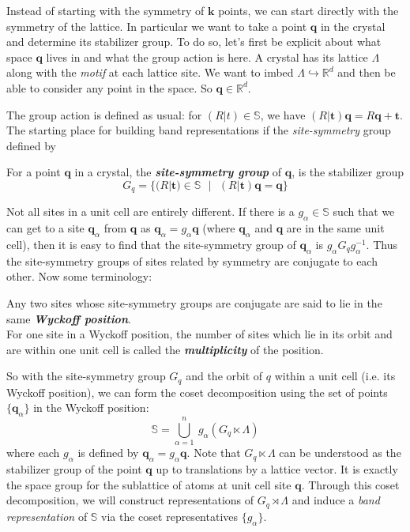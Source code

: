 \documentclass[9 pt]{report}
\def\*#1{\boldsymbol{#1}}
\begin{document}
Instead of starting with the symmetry of $\*k$ points, we can start directly with the symmetry of the lattice. In particular we want to take a point $\*q$ in the crystal and determine its stabilizer group. To do so, let's first be explicit about what space $\*q$ lives in and what the group action is here. A crystal has its lattice $\Lambda$ along with the \emph{motif} at each lattice site. We want to imbed $\Lambda \hookrightarrow \mathbb{R}^d$ and then be able to consider any point in the space. So $\*q\in \mathbb{R}^d$.

The group action is defined as usual: for $(R|t)\in\mathbb{S}$, we have $(R|\*t)\*q = R\*q + \*t$. The starting place for building band representations if the \emph{site-symmetry} group defined by
\\
\begin{tcolorbox}
	For a point $\*q$ in a crystal, the \emph{\textbf{site-symmetry group}} of $\*q$, is the stabilizer group 
	$$ G_q = \{ (R|\*t)\in \mathbb{S} \:\:\:|\:\:\: (R|\*t)\*q = \*q  \} $$
\end{tcolorbox}

\noindent Not all sites in a unit cell are entirely different. If there is a $g_\alpha\in\mathbb{S}$ such that we can get to a site $\*q_\alpha$ from $\*q$ as $\*q_\alpha=g_\alpha \*q$ (where $\*q_\alpha$ and $\*q$ are in the same unit cell), then it is easy to find that the site-symmetry group of $\*q_\alpha$ is $g_\alpha G_q g_\alpha^{-1}$. Thus the site-symmetry groups of sites related by symmetry are conjugate to each other. Now some terminology:
\\
\begin{tcolorbox}
	Any two sites whose site-symmetry groups are conjugate are said to lie in the same \textbf{\emph{Wyckoff position}}. 
	\\
	For one site in a Wyckoff position, the number of sites which lie in its orbit and are within one unit cell is called the \textbf{\emph{multiplicity}} of the position.
\end{tcolorbox}
So with the site-symmetry group $G_q$ and the orbit of $q$ within a unit cell (i.e. its Wyckoff position), we can form the coset decomposition using the set of points $\{\*q_\alpha \}$ in the Wyckoff position:
$$ \mathbb{S} = \bigcup_{\alpha=1}^n\:g_\alpha\left( G_q \ltimes \Lambda \right) $$
where each $g_\alpha$ is defined by $\*q_\alpha=g_\alpha\*q$. Note that $G_q\ltimes \Lambda$ can be understood as the stabilizer group of the point $\*q$ up to translations by a lattice vector. It is exactly the space group for the sublattice of atoms at unit cell site $\*q$. Through this coset decomposition, we will construct representations of $G_q\rtimes \Lambda$ and induce a \emph{band representation} of $\mathbb{S}$ via the coset representatives $\{g_\alpha\}$. 
\\ 
\end{document}
